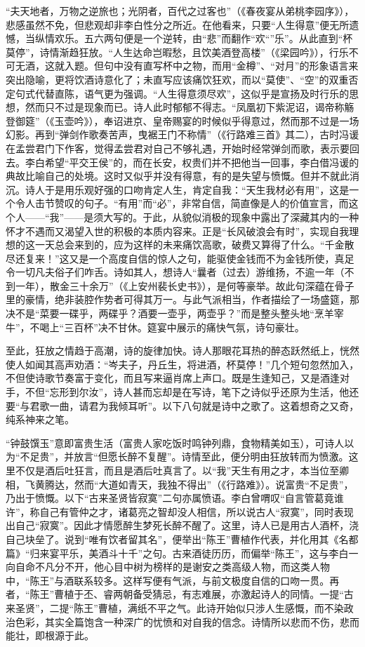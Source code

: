 \documentclass[letterpaper,10pt,english]{sphinxmanual}
\begin{document}
“夫天地者，万物之逆旅也；光阴者，百代之过客也”（《春夜宴从弟桃李园序》），悲感虽然不免，但悲观却非李白性分之所近。在他看来，只要“人生得意”便无所遗憾，当纵情欢乐。五六两句便是一个逆转，由“悲”而翻作“欢“”乐”。从此直到“杯莫停”，诗情渐趋狂放。“人生达命岂暇愁，且饮美酒登高楼”（《梁园吟》），行乐不可无酒，这就入题。但句中没有直写杯中之物，而用“金樽”、“对月”的形象语言来突出隐喻，更将饮酒诗意化了；未直写应该痛饮狂欢，而以“莫使”、“空”的双重否定句式代替直陈，语气更为强调。“人生得意须尽欢”，这似乎是宣扬及时行乐的思想，然而只不过是现象而已。诗人此时郁郁不得志。“凤凰初下紫泥诏，谒帝称觞登御筵”（《玉壶吟》），奉诏进京、皇帝赐宴的时候似乎得意过，然而那不过是一场幻影。再到“弹剑作歌奏苦声，曳裾王门不称情”（《行路难三首》其二），古时冯谖在孟尝君门下作客，觉得孟尝君对自己不够礼遇，开始时经常弹剑而歌，表示要回去。李白希望“平交王侯”的，而在长安，权贵们并不把他当一回事，李白借冯谖的典故比喻自己的处境。这时又似乎并没有得意，有的是失望与愤慨。但并不就此消沉。诗人于是用乐观好强的口吻肯定人生，肯定自我：“天生我材必有用”，这是一个令人击节赞叹的句子。“有用”而“必”，非常自信，简直像是人的价值宣言，而这个人——“我”——是须大写的。于此，从貌似消极的现象中露出了深藏其内的一种怀才不遇而又渴望入世的积极的本质内容来。正是“长风破浪会有时”，实现自我理想的这一天总会来到的，应为这样的未来痛饮高歌，破费又算得了什么。“千金散尽还复来！”这又是一个高度自信的惊人之句，能驱使金钱而不为金钱所使，真足令一切凡夫俗子们咋舌。诗如其人，想诗人“曩者（过去）游维扬，不逾一年（不到一年），散金三十余万”（《上安州裴长史书》），是何等豪举。故此句深蕴在骨子里的豪情，绝非装腔作势者可得其万一。与此气派相当，作者描绘了一场盛筵，那决不是“菜要一碟乎，两碟乎？酒要一壶乎，两壶乎？”而是整头整头地“烹羊宰牛”，不喝上“三百杯”决不甘休。筵宴中展示的痛快气氛，诗句豪壮。

至此，狂放之情趋于高潮，诗的旋律加快。诗人那眼花耳热的醉态跃然纸上，恍然使人如闻其高声劝酒：“岑夫子，丹丘生，将进酒，杯莫停！”几个短句忽然加入，不但使诗歌节奏富于变化，而且写来逼肖席上声口。既是生逢知己，又是酒逢对手，不但“忘形到尔汝”，诗人甚而忘却是在写诗，笔下之诗似乎还原为生活，他还要“与君歌一曲，请君为我倾耳听”。以下八句就是诗中之歌了。这着想奇之又奇，纯系神来之笔。

“钟鼓馔玉”意即富贵生活（富贵人家吃饭时鸣钟列鼎，食物精美如玉），可诗人以为“不足贵”，并放言“但愿长醉不复醒”。诗情至此，便分明由狂放转而为愤激。这里不仅是酒后吐狂言，而且是酒后吐真言了。以“我”天生有用之才，本当位至卿相，飞黄腾达，然而“大道如青天，我独不得出”（《行路难》）。说富贵“不足贵”，乃出于愤慨。以下“古来圣贤皆寂寞”二句亦属愤语。李白曾喟叹“自言管葛竟谁许”，称自己有管仲之才，诸葛亮之智却没人相信，所以说古人“寂寞”，同时表现出自己“寂寞”。因此才情愿醉生梦死长醉不醒了。这里，诗人已是用古人酒杯，浇自己块垒了。说到“唯有饮者留其名”，便举出“陈王”曹植作代表，并化用其《名都篇》“归来宴平乐，美酒斗十千”之句。古来酒徒历历，而偏举“陈王”，这与李白一向自命不凡分不开，他心目中树为榜样的是谢安之类高级人物，而这类人物中，“陈王”与酒联系较多。这样写便有气派，与前文极度自信的口吻一贯。再者，“陈王”曹植于丕、睿两朝备受猜忌，有志难展，亦激起诗人的同情。一提“古来圣贤”，二提“陈王”曹植，满纸不平之气。此诗开始似只涉人生感慨，而不染政治色彩，其实全篇饱含一种深广的忧愤和对自我的信念。诗情所以悲而不伤，悲而能壮，即根源于此。
\end{document}
